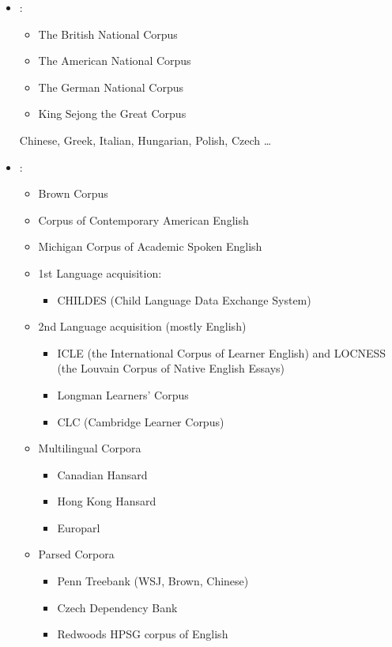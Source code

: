 \documentclass[a4paper,landscape,headrule,footrule]{foils}
\begin{document}
\begin{itemize}
\item {}:
  \begin{itemize}
  \item The British National Corpus
  \item The American National Corpus
  \item The German National Corpus
  \item King Sejong the Great Corpus
  \end{itemize}
  Chinese, Greek, Italian, Hungarian, Polish, Czech \ldots
\item {}:
  \begin{itemize}
  \item Brown Corpus
  \item Corpus of Contemporary American English
  \item  Michigan Corpus of Academic Spoken English
\newpage
  \item  1st Language acquisition:
    \begin{itemize}
    \item  CHILDES (Child Language Data Exchange System)
    \end{itemize}
  \item  2nd Language acquisition (mostly English)
    \begin{itemize}
    \item  ICLE (the International Corpus of Learner English) and LOCNESS (the Louvain Corpus of Native English Essays)
    \item  Longman Learners' Corpus
    \item  CLC (Cambridge Learner Corpus)
    \end{itemize}
  \item Multilingual Corpora
    \begin{itemize}
    \item Canadian Hansard
    \item Hong Kong Hansard
    \item Europarl
    \end{itemize}
  \item Parsed  Corpora
    \begin{itemize}
    \item Penn Treebank (WSJ, Brown, Chinese)
    \item Czech Dependency Bank
    \item Redwoods HPSG corpus of English
    \end{itemize}
\end{itemize}
\end{itemize}
\end{document}
